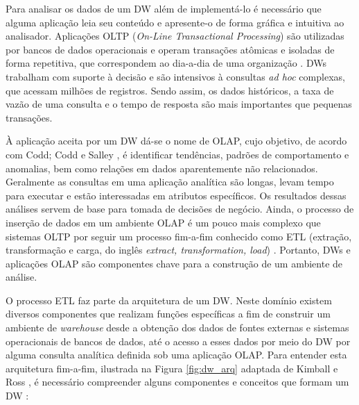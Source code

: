 Para analisar os dados de um DW além de implementá-lo é necessário que alguma aplicação leia seu conteúdo e apresente-o de forma gráfica e intuitiva ao analisador. Aplicações OLTP (\textit{On-Line Transactional Processing}) são utilizadas por bancos de dados operacionais e operam transações atômicas e isoladas de forma repetitiva, que correspondem ao dia-a-dia de uma organização \cite{chaudhuri1997overview}. DWs trabalham com suporte à decisão e são intensivos à consultas \textit{ad hoc} complexas, que acessam milhões de registros. Sendo assim, os dados históricos, a taxa de vazão de uma consulta e o tempo de resposta são mais importantes que pequenas transações.

À aplicação aceita por um DW dá-se o nome de OLAP, cujo objetivo, de acordo com Codd; Codd e Salley \cite{codd1998providing}, é identificar tendências, padrões de comportamento e anomalias, bem como relações em dados aparentemente não relacionados. Geralmente as consultas em uma aplicação analítica são longas, levam tempo para executar e estão interessadas 
em atributos específicos. Os resultados dessas análises servem de base para tomada de decisões de negócio. Ainda, o processo de inserção de dados em um ambiente OLAP é um pouco mais complexo que sistemas OLTP por seguir um processo fim-a-fim conhecido 
como ETL (extração, transformação e carga, do inglês \textit{extract, transformation, load}) \cite{vertabelo2017olap}. Portanto, DWs e aplicações OLAP são componentes chave para a construção de um ambiente de análise.

O processo ETL faz parte da arquitetura de um DW. Neste domínio existem diversos componentes que realizam funções específicas a fim de construir um ambiente de \textit{warehouse} desde a obtenção dos dados de fontes externas e sistemas operacionais de bancos de dados, até o acesso a esses dados por meio do DW por alguma consulta analítica definida sob uma aplicação OLAP. Para entender esta arquitetura fim-a-fim, ilustrada na Figura \ref{fig:dw_arq} adaptada de Kimball e Ross \cite{kimball2002dw}, é necessário compreender alguns componentes e conceitos que formam um DW \cite{kimball2002dw}:

